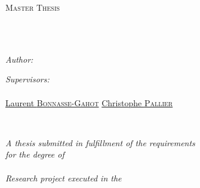 \documentclass[
11pt, %
english, %
singlespacing, %
parskip, %
headsepline, %
table
]{MastersDoctoralThesis} %
\author{Songsheng \textsc{Ying}} %
\begin{document}
\frontmatter %

\pagestyle{plain} %


\begin{titlepage}
\begin{center}

\vspace*{.06\textheight}
{\scshape\LARGE \univname\par}\vspace{1.5cm} %
\textsc{\Large Master Thesis}\\[0.5cm] %

\HRule \\[0.4cm] %
{\huge \bfseries \ttitle\par}\vspace{0.4cm} %
\HRule \\[1.5cm] %
 
\begin{minipage}[t]{0.4\textwidth}
\begin{flushleft} \large
\emph{Author:}\\
\href{https://nicolasy.tk}{\authorname} %
\end{flushleft}
\end{minipage}
\begin{minipage}[t]{0.4\textwidth}
\begin{flushright} \large
\emph{Supervisors:} \\
\href{http://cams.ehess.fr/sabine-ploux/}{\supname}\\ %
\href{http://cams.ehess.fr/laurent-bonnasse-gahot/}{Laurent \textsc{Bonnasse-Gahot}}
\href{http://www.pallier.org/pages/cv.html#cv}{Christophe \textsc{Pallier}}
\end{flushright}
\end{minipage}\\[2cm]

\vfill

\large \textit{A thesis submitted in fulfillment of the requirements\\ for the degree of }\\
\large \textit{\degreename}\\[0.5cm] %
\textit{Research project executed in the}\\[0.4cm]
\groupname\\\deptname\\[2cm] %
 

\end{center}
\end{titlepage}
\end{document}
